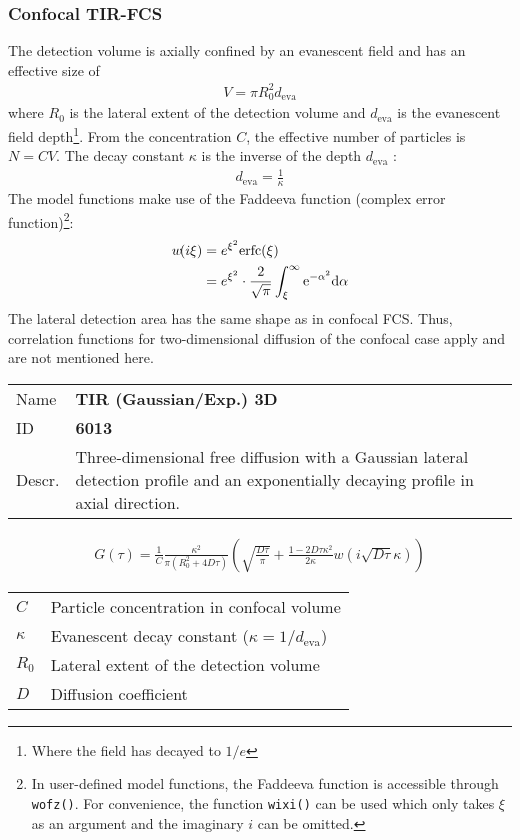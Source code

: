 \subsubsection{Confocal TIR-FCS}
The detection volume is axially confined by an evanescent field and has an effective size of
\begin{align}
V = \pi R_0^2 d_\mathrm{eva}
\end{align} 
where $R_0$ is the lateral extent of the detection volume and $d_\mathrm{eva}$ is the evanescent field depth\footnote{Where the field has decayed to $1/e$}. From the concentration $C$, the effective number of particles is $N=CV$.
The decay constant $\kappa$ is the inverse of the depth $d_\mathrm{eva}$ :
\begin{align}
d_\mathrm{eva} = \frac{1}{\kappa}
\end{align} 
The model functions make use of the Faddeeva function (complex error function)\footnote{In user-defined model functions, the Faddeeva function is accessible through \texttt{wofz()}. For convenience, the function \texttt{wixi()} can be used which only takes $\xi$ as an argument and the imaginary $i$ can be omitted.}:
\begin{align}
w\!(i\xi) &= e^{\xi^2} \mathrm{erfc}(\xi) \\
\notag &= e^{\xi^2} \cdot  \frac{2}{\sqrt{\pi}} \int_\xi^\infty \mathrm{e}^{-\alpha^2} \mathrm{d\alpha} \label{eq:faddeeva}
\end{align} 
The lateral detection area has the same shape as in confocal FCS. Thus, correlation functions for two-dimensional diffusion of the confocal case apply and are not mentioned here. \\
\vspace{2em}


\noindent \begin{tabular}{lp{}}
Name & \textbf{TIR (Gaussian/Exp.) 3D} \\ 
ID & \textbf{6013} \\ 
Descr. &  Three-dimensional free diffusion with a Gaussian lateral detection profile and an exponentially decaying profile in axial direction\cite{Starr2001, Hassler2005, Ohsugi2006}. \\ 
\end{tabular}
\begin{align}
G(\tau) = \frac{1}{C}  \frac{ \kappa^2}{ \pi (R_0^2 +4D\tau)}
 \left( \sqrt{\frac{D \tau}{\pi}} + \frac{1 - 2 D \tau \kappa^2}{2 \kappa}  w\!\left(i \sqrt{D \tau} \kappa\right) \right)
\end{align} 
\begin{center}
\begin{tabular}{ll}
$C$ & Particle concentration in confocal volume \\ 
$\kappa$ &  Evanescent decay constant ($\kappa = 1/d_\mathrm{eva}$)\\ 
$R_0$ & Lateral extent of the detection volume \\
$D$ & Diffusion coefficient  \\
\end{tabular}
\end{center}
\vspace{2em}


